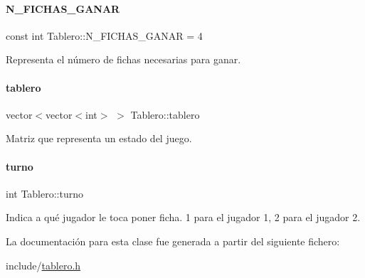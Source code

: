 \paragraph{\texorpdfstring{N\+\_\+\+F\+I\+C\+H\+A\+S\+\_\+\+G\+A\+N\+AR}{N\_FICHAS\_GANAR}}
{\footnotesize\ttfamily const int Tablero\+::\+N\+\_\+\+F\+I\+C\+H\+A\+S\+\_\+\+G\+A\+N\+AR = 4\hspace{0.3cm}{\ttfamily [static]}}



Representa el número de fichas necesarias para ganar. 

\hypertarget{classTablero_a5df607d108c0c0a14aa4f393b7f43030}{}\label{classTablero_a5df607d108c0c0a14aa4f393b7f43030} 
\paragraph{\texorpdfstring{tablero}{tablero}}
{\footnotesize\ttfamily vector$<$vector$<$int$>$ $>$ Tablero\+::tablero\hspace{0.3cm}{\ttfamily [private]}}



Matriz que representa un estado del juego. 

\hypertarget{classTablero_ae460b4a3245da075dd381365abf158bc}{}\label{classTablero_ae460b4a3245da075dd381365abf158bc} 
\paragraph{\texorpdfstring{turno}{turno}}
{\footnotesize\ttfamily int Tablero\+::turno\hspace{0.3cm}{\ttfamily [private]}}



Indica a qué jugador le toca poner ficha. 1 para el jugador 1, 2 para el jugador 2. 



La documentación para esta clase fue generada a partir del siguiente fichero\+:\begin{DoxyCompactItemize}
\item 
include/\hyperlink{tablero_8h}{tablero.\+h}\end{DoxyCompactItemize}
